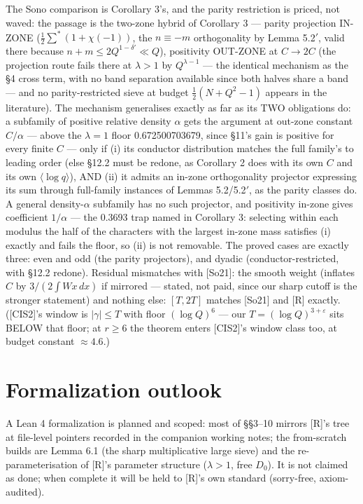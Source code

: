 \documentclass[11pt]{amsart}
\theoremstyle{plain}
\theoremstyle{remark}
\begin{document}
\subsection{}
The Sono comparison is Corollary 3's, and the parity restriction is priced, not
waved: the passage is the two-zone hybrid of Corollary 3 --- parity projection
IN-ZONE ($\tfrac{1}{2}\sum^{*}(1 + \chi(-1))$, the $n \equiv -m$ orthogonality by
Lemma 5.2$'$, valid there because $n + m \le 2Q^{1-\delta'} \ll Q$), positivity
OUT-ZONE at $C \to 2C$ (the projection route fails there at $\lambda > 1$ by
$Q^{\lambda-1}$ --- the identical mechanism as the \S4 cross term, with no band
separation available since both halves share a band --- and no parity-restricted
sieve at budget $\tfrac{1}{2}(N + Q^2 - 1)$ appears in the literature). The mechanism
generalises exactly as far as its TWO obligations do: a subfamily of positive
relative density $\alpha$ gets the argument at out-zone constant $C/\alpha$ --- above
the $\lambda = 1$ floor 0.672500703679, since \S11's gain is positive for every
finite $C$ --- only if (i) its conductor distribution matches the full family's to
leading order (else \S12.2 must be redone, as Corollary 2 does with its own $C$ and
its own $\langle \log q\rangle$), AND (ii) it admits an in-zone orthogonality
projector expressing its sum through full-family instances of Lemmas 5.2/5.2$'$, as
the parity classes do. A general density-$\alpha$ subfamily has no such projector,
and positivity in-zone gives coefficient $1/\alpha$ --- the 0.3693 trap named in
Corollary 3: selecting within each modulus the half of the characters with the
largest in-zone mass satisfies (i) exactly and fails the floor, so (ii) is not
removable. The proved cases are exactly three: even and odd (the parity projectors),
and dyadic (conductor-restricted, with \S12.2 redone). Residual mismatches with
[So21]: the smooth weight (inflates $C$ by $3/(2\int Wx \, dx)$ if mirrored ---
stated, not paid, since our sharp cutoff is the stronger statement) and nothing else:
$[T, 2T]$ matches [So21] and [R] exactly. ([CIS2]'s window is $|\gamma| \le T$ with
floor $(\log Q)^{6}$ --- our $T = (\log Q)^{3+\varepsilon}$ sits BELOW that floor; at
$r \ge 6$ the theorem enters [CIS2]'s window class too, at budget constant
$\approx 4.6$.)

\section{Formalization outlook}

A Lean 4 formalization is planned and scoped: most of \S\S3--10 mirrors [R]'s tree at
file-level pointers recorded in the companion working notes; the from-scratch builds
are Lemma 6.1 (the sharp multiplicative large sieve) and the re-parameterisation of
[R]'s parameter structure ($\lambda > 1$, free $D_0$). It is not claimed as done;
when complete it will be held to [R]'s own standard (sorry-free, axiom-audited).
\end{document}
